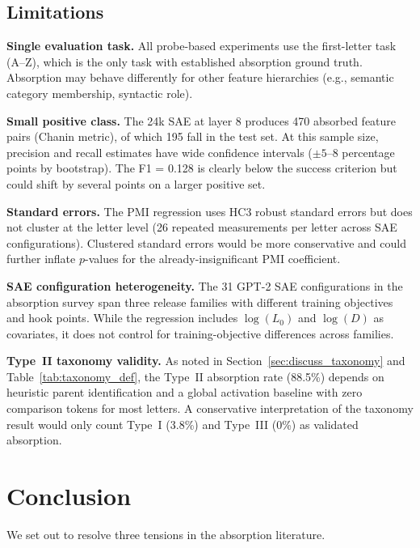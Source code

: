 \documentclass{article}
\begin{document}
\subsection{Limitations}

\textbf{Single evaluation task.} All probe-based experiments use the first-letter task (A--Z), which is the only task with established absorption ground truth. Absorption may behave differently for other feature hierarchies (e.g., semantic category membership, syntactic role).

\textbf{Small positive class.} The 24k SAE at layer 8 produces 470 absorbed feature pairs (Chanin metric), of which 195 fall in the test set. At this sample size, precision and recall estimates have wide confidence intervals ($\pm 5$--8 percentage points by bootstrap). The F1 = 0.128 is clearly below the success criterion but could shift by several points on a larger positive set.

\textbf{Standard errors.} The PMI regression uses HC3 robust standard errors but does not cluster at the letter level (26 repeated measurements per letter across SAE configurations). Clustered standard errors would be more conservative and could further inflate $p$-values for the already-insignificant PMI coefficient.

\textbf{SAE configuration heterogeneity.} The 31 GPT-2 SAE configurations in the absorption survey span three release families with different training objectives and hook points. While the regression includes $\log(L_0)$ and $\log(D)$ as covariates, it does not control for training-objective differences across families.

\textbf{Type~II taxonomy validity.} As noted in Section~\ref{sec:discuss_taxonomy} and Table~\ref{tab:taxonomy_def}, the Type~II absorption rate (88.5\%) depends on heuristic parent identification and a global activation baseline with zero comparison tokens for most letters. A conservative interpretation of the taxonomy result would only count Type~I (3.8\%) and Type~III (0\%) as validated absorption.


\section{Conclusion}
\label{sec:conclusion}

We set out to resolve three tensions in the absorption literature.
\end{document}
